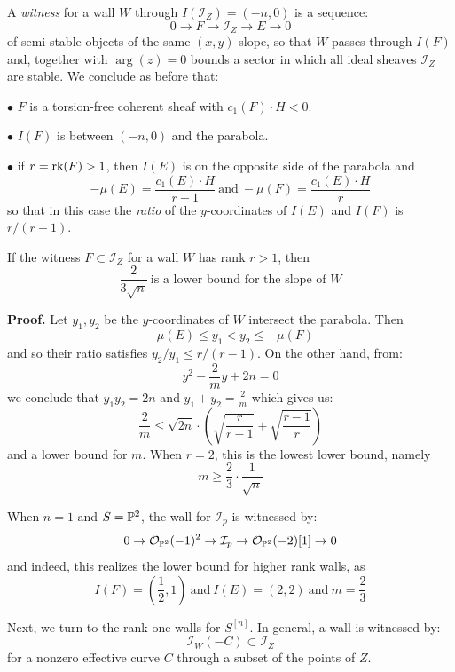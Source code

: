 \documentclass{amsart}
\begin{document}
\medskip

 A {\it witness} for a wall  $W$ through $I({\mathcal I}_Z) = (-n,0)$ is a sequence: 
\[ 0 \rightarrow F \rightarrow {\mathcal I}_Z \rightarrow E \rightarrow 0 \] 
of semi-stable objects of the same $(x,y)$-slope, so that $W$ passes through $I(F)$ and, together with $\arg(z) = 0$ bounds a sector in which 
all ideal sheaves ${\mathcal I}_Z$ are stable. 
We conclude as before that: 

\medskip

$\bullet$ $F$ is a torsion-free coherent sheaf with $c_1(F) \cdot H < 0$. 

\medskip

$\bullet$ $I(F)$ is between $(-n,0)$ and the parabola.   

\medskip

$\bullet$ if $r = \mbox{rk}(F) > 1$, then $I(E)$ is on the opposite side of the parabola and
\[ -\mu(E) = \frac{c_1(E)\cdot H}{r-1} \ \mbox{and} \ -\mu(F) = \frac{c_1(E)\cdot H}{r} \] 
so that in this case the {\it ratio} of the $y$-coordinates of $I(E)$ and $I(F)$ is $r/(r-1)$. 

\medskip

 If the witness $F \subset {\mathcal I}_Z$ for a wall $W$ has rank $r > 1$, then
\[ \frac 2{3\sqrt n} \ \mbox{
is a lower bound for the slope of $W$} \]  


{\bf Proof.} Let $y_1,y_2$ be the $y$-coordinates of $W$ intersect the parabola. Then 
\[ -\mu(E) \le y_1 < y_2 \le -\mu(F) \] 
and so their ratio satisfies 
${y_2}/{y_1} \le{r}/{(r-1)}$.
On the other hand, from: 
\[ y^2 - \frac 2m y + 2n = 0 \] 
we conclude that
$y_1y_2 = 2n$ and $y_1 + y_2 = \frac 2m$
which gives us:
\[ \frac 2m \le \sqrt{2n} \cdot \left( \sqrt{ \frac r{r-1}} + \sqrt{\frac{r-1}r }\right) \]  
and a lower bound for $m$. 
When $r = 2$, this is the lowest lower bound, namely  
\[ m \ge \frac 23 \cdot \frac 1{\sqrt n}  \] 


 When $n = 1$ and $S = {\mathbb P}^2$, the wall for ${\mathcal I}_p$  is witnessed by: 
\[ 0 \rightarrow {\mathcal O}_{{\mathbb P}^2}(-1)^2 \rightarrow {\mathcal I}_p \rightarrow {\mathcal O}_{{\mathbb P}^2}(-2)[1] \rightarrow 0 \]  
and indeed, this realizes the lower bound for higher rank walls, as 
\[ I(F) = \left( \frac 12, 1\right) \ \mbox{and} \ I(E) = \left(2,2\right)\ \mbox{and} \ m = \frac 23 \] 

Next, we turn to the rank one walls for $S^{[n]}$. In general, a wall is witnessed by: 
\[ {\mathcal I}_W(-C) \subset {\mathcal I}_Z \] 
for a nonzero effective curve $C$ through a subset of the points of $Z$. 
\end{document}
